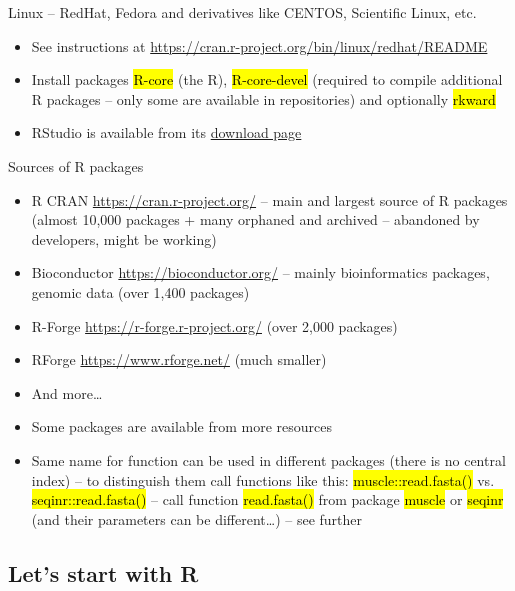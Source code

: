 \documentclass[compress, ucs, xelatex, 11pt, xcolor=svgnames,
  hyperref={
    bookmarks=true,
    unicode=true,
    colorlinks=true,
    pdftitle={Molecular data in R},
    plainpages=false,
    pdfauthor={Vojtech Zeisek},
    pdfsubject={Course about phylogeny and evolution in R},
    pdfcreator={XeLaTeX},
    pdfkeywords={R, evolution, phylogeny, molecular data},
    linkcolor=Tomato,
    anchorcolor=SaddleBrown,
    citecolor=Goldenrod,
    filecolor=DarkMagenta,
    menucolor=Sienna,
    urlcolor=DarkTurquoise,
    pdftex},
  url={hyphens, lowtilde} %
  ]{beamer}
\renewcommand{\texttt}[1]{\hl{\ttfamily #1}}
\begin{document}
\begin{frame}{Linux -- RedHat, Fedora and derivatives like CENTOS, Scientific Linux, etc.}
  \begin{itemize}
    \item See instructions at \url{https://cran.r-project.org/bin/linux/redhat/README}
    \item Install packages \texttt{R-core} (the R), \texttt{R-core-devel} (required to compile additional R packages -- only some are available in repositories) and optionally \texttt{rkward}
    \item RStudio is available from its \href{https://www.rstudio.com/products/rstudio/download/\#download}{download page}
  \end{itemize}
\end{frame}

\begin{frame}{Sources of R packages}
  \label{sources}
  \begin{itemize}
    \item R CRAN \url{https://cran.r-project.org/} -- main and largest source of R packages (almost 10,000 packages + many orphaned and archived -- abandoned by developers, might be working)
    \item Bioconductor \url{https://bioconductor.org/} -- mainly bioinformatics packages, genomic data (over 1,400 packages)
    \item R-Forge \url{https://r-forge.r-project.org/} (over 2,000 packages)
    \item RForge \url{https://www.rforge.net/} (much smaller)
    \item And more\ldots
    \item Some packages are available from more resources
    \item Same name for function can be used in different packages (there is no central index) -- to distinguish them call functions like this: \texttt{muscle::read.fasta()} vs. \texttt{seqinr::read.fasta()} -- call function \texttt{read.fasta()} from package \texttt{muscle} \alert{or} \texttt{seqinr} (and their parameters can be different\ldots) -- see further
  \end{itemize}
\end{frame}

\subsection{Let's start with R}
\end{document}
